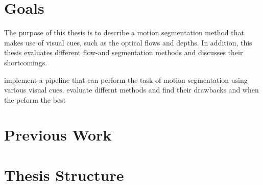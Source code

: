 \section{Goals}

The purpose of this thesis is to describe a motion segmentation method that makes use of visual cues, such as the optical flows and depths. In addition, this thesis evaluates different flow-and segmentation methods and discusses their shortcomings.


implement a pipeline that can perform the task of motion segmentation using various visual cues.
evaluate differnt methods and find their drawbacks and when the peform the best

\section{Previous Work}
\section{Thesis Structure}